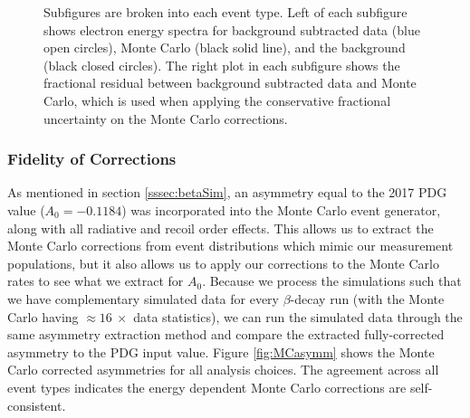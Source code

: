\begin{figure}[p]
  \caption{Subfigures are broken into each event type.
    Left of each subfigure shows electron energy spectra for background subtracted data (blue open circles),
    Monte Carlo (black solid line), and the background (black closed circles). The right plot in each
    subfigure shows the fractional residual between background subtracted data and Monte Carlo, which is used
    when applying the conservative fractional uncertainty on the Monte Carlo corrections.}
  \label{fig:fracResid}
\end{figure}

\subsubsection{Fidelity of Corrections}

As mentioned in section \ref{sssec:betaSim}, an asymmetry equal to the
2017 PDG value ($A_0=-0.1184$) was incorporated into the Monte Carlo
event generator, along with all radiative and recoil order effects. This allows
us to extract the Monte Carlo corrections from event distributions which mimic
our measurement populations, but it also allows us to apply our corrections
to the Monte Carlo rates to see what we extract for $A_0$. Because we process
the simulations such that we have complementary simulated data for every
$\beta$-decay run (with the Monte Carlo having $\approx 16~\times$ data statistics),
we can run the simulated data through the same asymmetry extraction method and compare
the extracted fully-corrected asymmetry to the PDG input value. Figure \ref{fig:MCasymm}
shows the Monte Carlo corrected asymmetries for all analysis choices. The agreement across
all event types indicates the energy dependent Monte Carlo corrections are self-consistent.


